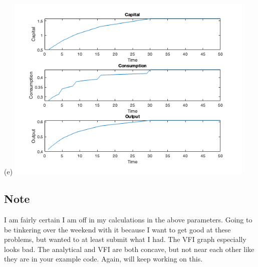 \documentclass[10pt, a4paper]{article}
\begin{document}
  (e) \includegraphics*[width = 0.9\textwidth]{2e.png}
  
\subsection*{Note}
  I am fairly certain I am off in my calculations in the above parameters. Going to be tinkering over the weekend with it because I want to get good at these problems, but wanted to at least submit what I had. The VFI graph especially looks bad. The analytical and VFI are both concave, but not near each other like they are in your example code. Again, will keep working on this.
\end{document}
